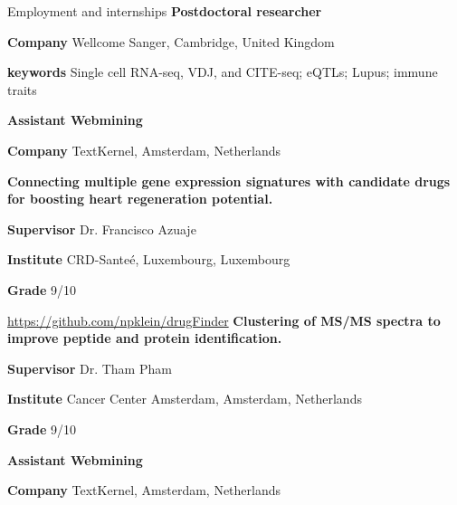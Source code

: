 \begin{rubric}{Employment and internships}
%
%
%
\textbf{Postdoctoral researcher} \par
\textbf{Company} Wellcome Sanger, Cambridge, United Kingdom \par
\textbf{keywords} Single cell RNA-seq, VDJ, and CITE-seq; eQTLs; Lupus; immune traits

%
\textbf{Assistant Webmining} \par
\textbf{Company} TextKernel, Amsterdam, Netherlands

%
\textbf{Connecting multiple gene expression signatures with candidate drugs for boosting heart regeneration potential.} \par
\textbf{Supervisor} Dr. Francisco Azuaje \par
\textbf{Institute} CRD-Sante\'e, Luxembourg, Luxembourg \par
\textbf{Grade} 9/10 \par
\url{https://github.com/npklein/drugFinder}
%
%
\textbf{Clustering of MS/MS spectra to improve peptide and protein identification.} \par
\textbf{Supervisor} Dr. Tham Pham \par
\textbf{Institute} Cancer Center Amsterdam, Amsterdam, Netherlands\par
\textbf{Grade} 9/10 \par
%
%
\textbf{Assistant Webmining} \par
\textbf{Company} TextKernel, Amsterdam, Netherlands

%



\end{rubric}
